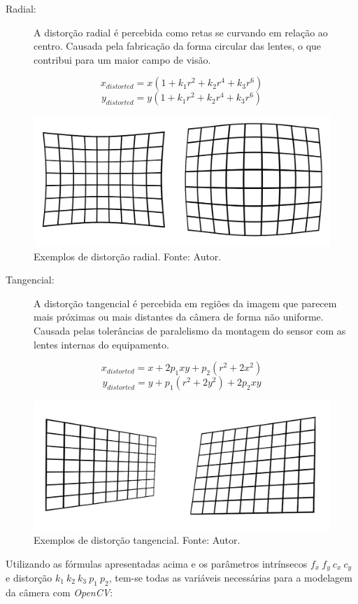 \begin{description}
    \item[Radial:] A distorção radial é percebida como retas se curvando em relação ao centro. Causada pela fabricação da forma circular das lentes, o que contribui para um maior campo de visão.
\end{description}
\[ x_{distorted} = x(1+k_1 r^2 + k_2 r^4 + k_3 r^6) \]
\[ y_{distorted} = y(1+k_1 r^2 + k_2 r^4 + k_3 r^6) \]
\begin{figure}[H] %
    \centering
    \includegraphics[width=.65\linewidth]{figuras/radial-dist.png}
    \caption{Exemplos de distorção radial. Fonte: Autor.}
    \label{fig:radial_dist}
\end{figure}
\begin{description}
    \item[Tangencial:] A distorção tangencial é percebida em regiões da imagem que parecem mais próximas ou mais distantes da câmera de forma não uniforme. Causada pelas tolerâncias de paralelismo da montagem do sensor com as lentes internas do equipamento.
\end{description}
\[ x_{distorted} = x + 2 p_1 x y + p_2 (r^2 + 2x^2)\]
\[ y_{distorted} = y + p_1(r^2+2y^2)+2p_2xy\]
\begin{figure}[H] 
    \centering
    \includegraphics[width=.65\linewidth]{figuras/tan-dist.png}
    \caption{Exemplos de distorção tangencial. Fonte: Autor.}
    \label{fig:tan_dist}
\end{figure}

Utilizando as fórmulas apresentadas acima e os parâmetros intrínsecos \(f_x \ f_y \ c_x \ c_y\) e distorção \(k_1 \ k_2 \ k_3 \ p_1 \ p_2\), tem-se todas as variáveis necessárias para a modelagem da câmera com \textit{OpenCV}:

